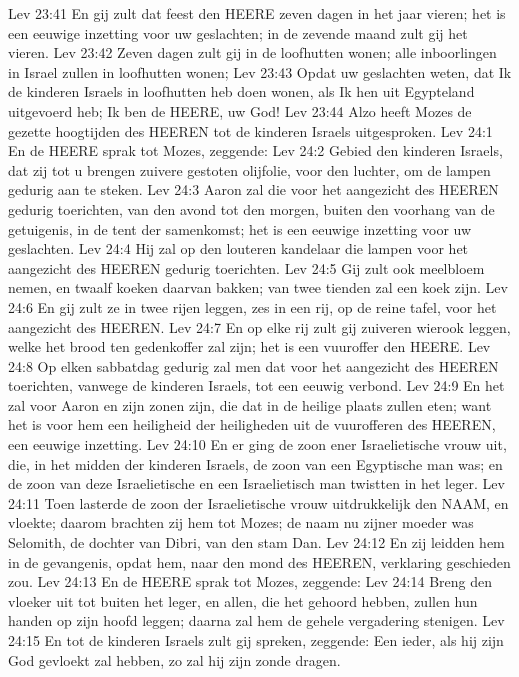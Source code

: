 Lev 23:41  En gij zult dat feest den HEERE zeven dagen in het jaar vieren; het is een eeuwige inzetting voor uw geslachten; in de zevende maand zult gij het vieren.
Lev 23:42  Zeven dagen zult gij in de loofhutten wonen; alle inboorlingen in Israel zullen in loofhutten wonen;
Lev 23:43  Opdat uw geslachten weten, dat Ik de kinderen Israels in loofhutten heb doen wonen, als Ik hen uit Egypteland uitgevoerd heb; Ik ben de HEERE, uw God!
Lev 23:44  Alzo heeft Mozes de gezette hoogtijden des HEEREN tot de kinderen Israels uitgesproken.
Lev 24:1  En de HEERE sprak tot Mozes, zeggende:
Lev 24:2  Gebied den kinderen Israels, dat zij tot u brengen zuivere gestoten olijfolie, voor den luchter, om de lampen gedurig aan te steken.
Lev 24:3  Aaron zal die voor het aangezicht des HEEREN gedurig toerichten, van den avond tot den morgen, buiten den voorhang van de getuigenis, in de tent der samenkomst; het is een eeuwige inzetting voor uw geslachten.
Lev 24:4  Hij zal op den louteren kandelaar die lampen voor het aangezicht des HEEREN gedurig toerichten.
Lev 24:5  Gij zult ook meelbloem nemen, en twaalf koeken daarvan bakken; van twee tienden zal een koek zijn.
Lev 24:6  En gij zult ze in twee rijen leggen, zes in een rij, op de reine tafel, voor het aangezicht des HEEREN.
Lev 24:7  En op elke rij zult gij zuiveren wierook leggen, welke het brood ten gedenkoffer zal zijn; het is een vuuroffer den HEERE.
Lev 24:8  Op elken sabbatdag gedurig zal men dat voor het aangezicht des HEEREN toerichten, vanwege de kinderen Israels, tot een eeuwig verbond.
Lev 24:9  En het zal voor Aaron en zijn zonen zijn, die dat in de heilige plaats zullen eten; want het is voor hem een heiligheid der heiligheden uit de vuurofferen des HEEREN, een eeuwige inzetting.
Lev 24:10  En er ging de zoon ener Israelietische vrouw uit, die, in het midden der kinderen Israels, de zoon van een Egyptische man was; en de zoon van deze Israelietische en een Israelietisch man twistten in het leger.
Lev 24:11  Toen lasterde de zoon der Israelietische vrouw uitdrukkelijk den NAAM, en vloekte; daarom brachten zij hem tot Mozes; de naam nu zijner moeder was Selomith, de dochter van Dibri, van den stam Dan.
Lev 24:12  En zij leidden hem in de gevangenis, opdat hem, naar den mond des HEEREN, verklaring geschieden zou.
Lev 24:13  En de HEERE sprak tot Mozes, zeggende:
Lev 24:14  Breng den vloeker uit tot buiten het leger, en allen, die het gehoord hebben, zullen hun handen op zijn hoofd leggen; daarna zal hem de gehele vergadering stenigen.
Lev 24:15  En tot de kinderen Israels zult gij spreken, zeggende: Een ieder, als hij zijn God gevloekt zal hebben, zo zal hij zijn zonde dragen.
